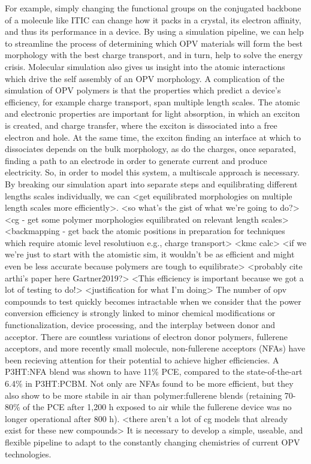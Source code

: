 For example, simply changing the functional groups on the conjugated backbone of a molecule like ITIC can change how it packs in a crystal, its electron affinity, and thus its performance in a device\cite{Swick2019a}.
By using a simulation pipeline, we can help to streamline the process of determining which OPV materials will form the best morphology with the best charge transport, and in turn, help to solve the energy crisis.
Molecular simulation also gives us insight into the atomic interactions which drive the self assembly of an OPV morphology.
A complication of the simulation of OPV polymers is that the properties which predict a device's efficiency, for example charge transport, span multiple length scales.
The atomic and electronic properties are important for light absorption, in which an exciton is created, and charge transfer, where the exciton is dissociated into a free electron and hole\cite{Scharber2006,Hoppe2004,Mazzio2015}.
At the same time, the exciton finding an interface at which to dissociates depends on the bulk morphology, as do the charges, once separated, finding a path to an electrode in order to generate current and produce electricity.
So, in order to model this system, a multiscale approach is necessary.
By breaking our simulation apart into separate steps and equilibrating different lengths scales individually, we can <get equilibrated morphologies on multiple length scales more efficiently>. %
<so what's the gist of what we're going to do?>
<cg - get some polymer morphologies equilibrated on relevant length scales>
<backmapping - get back the atomic positions in preparation for techniques which require atomic level resolutiuon e.g., charge transport>
<kmc calc>
<if we we're just to start with the atomistic sim, it wouldn't be as efficient and might even be less accurate because polymers are tough to equilibrate> <probably cite arthi's paper here Gartner2019?>
<This efficiency is important because we got a lot of testing to do!>
<justification for what I'm doing>
The number of opv compounds to test quickly becomes intractable when we consider that the power conversion efficiency is strongly linked to minor chemical modifications or functionalization, device processing, and the interplay between donor and acceptor\cite{Mazzio2015,Swick2019a}.
There are countless variations of electron donor polymers, fullerene acceptors, and more recently small molecule, non-fullerene acceptors (NFAs) have been recieving attention for their potential to achieve higher efficiencies\cite{Dou2013}.
A P3HT:NFA blend was shown to have 11\% PCE, compared to the state-of-the-art 6.4\% in P3HT:PCBM\cite{Baran2017}.
Not only are NFAs found to be more efficient, but they also show to be more stabile in air than polymer:fullerene blends (retaining 70-80\% of the PCE after 1,200 h exposed to air while the fullerene device was no longer operational after 800 h)\cite{Baran2017}.
<there aren't a lot of cg models that already exist for these new compounds>
It is necessary to develop a simple, useable, and flexible pipeline to adapt to the constantly changing chemistries of current OPV technologies. %

